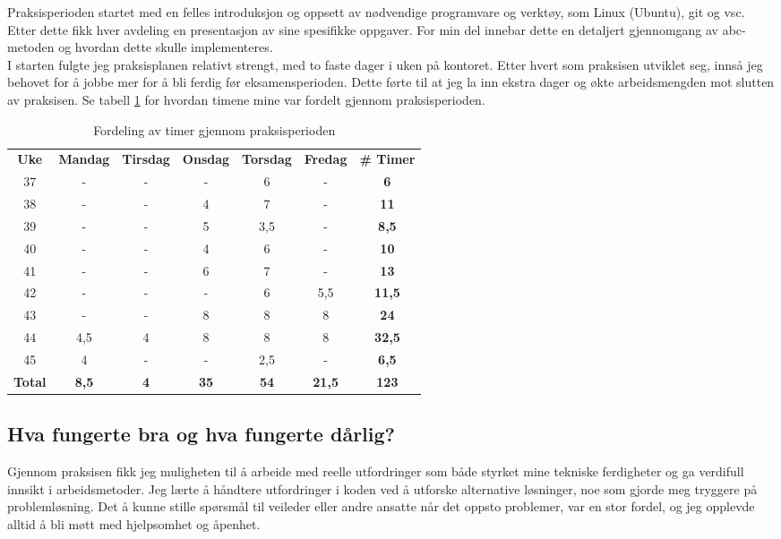Praksisperioden startet med en felles introduksjon og oppsett av nødvendige programvare og verktøy, som Linux (Ubuntu), \Gls{git} og \gls{vsc}. Etter dette fikk hver avdeling en presentasjon av sine spesifikke oppgaver. For min del innebar dette en detaljert gjennomgang av \gls{abc}-metoden og hvordan dette skulle implementeres. \\

I starten fulgte jeg praksisplanen relativt strengt, med to faste dager i uken på kontoret. Etter hvert som praksisen utviklet seg, innså jeg behovet for å jobbe mer for å bli ferdig før eksamensperioden. Dette førte til at jeg la inn ekstra dager og økte arbeidsmengden mot slutten av praksisen. Se tabell \ref{tab:timefordeling} for hvordan timene mine var fordelt gjennom praksisperioden.

\begin{table}[H]
    \centering
    \begin{tabular}{ccccccc}
        \textbf{Uke} & \textbf{Mandag} & \textbf{Tirsdag} & \textbf{Onsdag} & \textbf{Torsdag} & \textbf{Fredag} & \textbf{\# Timer}\\
        37 & - & - & - & 6 & - & \textbf{6}\\
        38 & - & - & 4 & 7 & - & \textbf{11}\\
        39 & - & - & 5 & 3,5 & - & \textbf{8,5}\\
        40 & - & - & 4 & 6 & - & \textbf{10}\\
        41 & - & - & 6 & 7 & - & \textbf{13}\\
        42 & - & - & - & 6 & 5,5 & \textbf{11,5}\\
        43 & - & - & 8 & 8 & 8 & \textbf{24}\\
        44 & 4,5 & 4 & 8 & 8 & 8 & \textbf{32,5}\\
        45 & 4 & - & - & 2,5 & - & \textbf{6,5}\\
        \textbf{Total} & \textbf{8,5} & \textbf{4} & \textbf{35} & \textbf{54} & \textbf{21,5} & \textbf{123}\\
    \end{tabular}
    \caption{Fordeling av timer gjennom praksisperioden}
    \label{tab:timefordeling}
\end{table}

\subsection{Hva fungerte bra og hva fungerte dårlig?}
Gjennom praksisen fikk jeg muligheten til å arbeide med reelle utfordringer som både styrket mine tekniske ferdigheter og ga verdifull innsikt i arbeidsmetoder. Jeg lærte å håndtere utfordringer i koden ved å utforske alternative løsninger, noe som gjorde meg tryggere på problemløsning. Det å kunne stille spørsmål til veileder eller andre ansatte når det oppsto problemer, var en stor fordel, og jeg opplevde alltid å bli møtt med hjelpsomhet og åpenhet. \\

